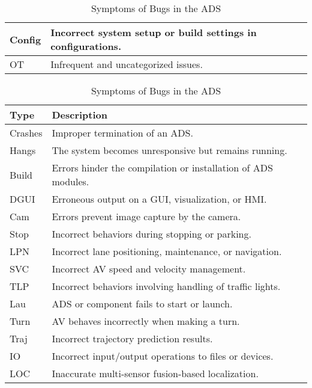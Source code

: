 \begin{table}[ht!]
\begin{minipage}{0.52\linewidth}
\begin{adjustbox}{width=\linewidth}
\begin{tabular}{|l|l|}
        \hline
        Config & Incorrect system setup or build settings in configurations. \\
        \hline
        OT & Infrequent and uncategorized issues. \\
        \hline
        \end{tabular}
        \end{adjustbox}
        \label{tab:root_causes_ads}
    \end{minipage}
    \hfill
    \begin{minipage}{0.47\linewidth}
        \centering
        \caption{Symptoms of Bugs in the ADS}
        \begin{adjustbox}{width=\linewidth}
        \begin{tabular}{|l|l|}
        \hline
        \textbf{Type} & \textbf{Description} \\
        \hline
        Crashes & Improper termination of an ADS. \\
        \hline
        Hangs & The system becomes unresponsive but remains running. \\
        \hline
        Build & Errors hinder the compilation or installation of ADS modules. \\
        \hline
        DGUI & Erroneous output on a GUI, visualization, or HMI. \\
        \hline
        Cam & Errors prevent image capture by the camera. \\
        \hline
        Stop & Incorrect behaviors during stopping or parking. \\
        \hline
        LPN & Incorrect lane positioning, maintenance, or navigation. \\
        \hline
        SVC & Incorrect AV speed and velocity management. \\
        \hline
        TLP & Incorrect behaviors involving handling of traffic lights. \\
        \hline
        Lau & ADS or component fails to start or launch. \\
        \hline
        Turn & AV behaves incorrectly when making a turn. \\
        \hline
        Traj & Incorrect trajectory prediction results. \\
        \hline
        IO & Incorrect input/output operations to files or devices. \\
        \hline
        LOC & Inaccurate multi-sensor fusion-based localization. \\
        \hline

\end{tabular}
\end{adjustbox}
\end{minipage}
\end{table}
